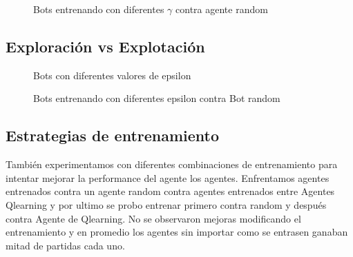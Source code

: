 \begin{figure}[H]
\begin{center}
\caption{Bots entrenando con diferentes $\gamma$ contra agente random}
\label{fig:gamma}
\end{center}
\end{figure}

\subsection{Exploración vs Explotación}

\begin{figure}[H]
\begin{center}
\caption{Bots con diferentes valores de epsilon}
\label{fig:epsilon}
\end{center}
\end{figure}


\begin{figure}[H]
\begin{center}
\caption{Bots entrenando con diferentes epsilon contra Bot random}
\label{fig:epsilon2}
\end{center}
\end{figure}


\subsection{Estrategias de entrenamiento}

También experimentamos con diferentes combinaciones de entrenamiento para intentar mejorar la performance del agente los agentes. Enfrentamos agentes entrenados contra un agente random contra agentes entrenados entre Agentes Qlearning y por ultimo se probo entrenar primero contra random y después contra Agente de Qlearning. No se observaron mejoras modificando el entrenamiento y en promedio los agentes sin importar como se entrasen ganaban mitad de partidas cada uno.




